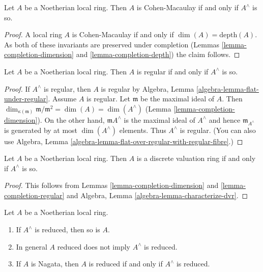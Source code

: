 \begin{lemma}
\label{lemma-completion-CM}
Let $A$ be a Noetherian local ring.
Then $A$ is Cohen-Macaulay if and only if $A^\wedge$ is so.
\end{lemma}

\begin{proof}
A local ring $A$ is Cohen-Macaulay if and only if $\dim(A) = \text{depth}(A)$.
As both of these invariants are preserved under completion
(Lemmas \ref{lemma-completion-dimension} and \ref{lemma-completion-depth})
the claim follows.
\end{proof}

\begin{lemma}
\label{lemma-completion-regular}
Let $A$ be a Noetherian local ring.
Then $A$ is regular if and only if $A^\wedge$ is so.
\end{lemma}

\begin{proof}
If $A^\wedge$ is regular, then $A$ is regular by
Algebra, Lemma \ref{algebra-lemma-flat-under-regular}.
Assume $A$ is regular. Let $\mathfrak m$ be the maximal ideal
of $A$. Then $\dim_{\kappa(\mathfrak m)} \mathfrak m/\mathfrak m^2 =
\dim(A) = \dim(A^\wedge)$ (Lemma \ref{lemma-completion-dimension}).
On the other hand, $\mathfrak mA^\wedge$ is the maximal ideal of
$A^\wedge$ and hence $\mathfrak m_{A^\wedge}$
is generated by at most $\dim(A^\wedge)$ elements. Thus $A^\wedge$ is regular.
(You can also use
Algebra, Lemma \ref{algebra-lemma-flat-over-regular-with-regular-fibre}.)
\end{proof}

\begin{lemma}
\label{lemma-completion-dvr}
Let $A$ be a Noetherian local ring.
Then $A$ is a discrete valuation ring if and only if $A^\wedge$ is so.
\end{lemma}

\begin{proof}
This follows from Lemmas \ref{lemma-completion-dimension} and
\ref{lemma-completion-regular} and
Algebra, Lemma \ref{algebra-lemma-characterize-dvr}.
\end{proof}

\begin{lemma}
\label{lemma-completion-reduced}
Let $A$ be a Noetherian local ring.
\begin{enumerate}
\item If $A^\wedge$ is reduced, then so is $A$.
\item In general $A$ reduced does not imply $A^\wedge$ is reduced.
\item If $A$ is Nagata, then $A$ is reduced if and only if $A^\wedge$
is reduced.
\end{enumerate}
\end{lemma}

